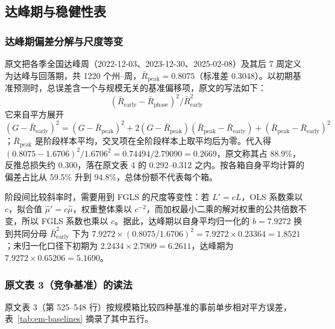 \subsection{达峰期与稳健性表}

\subsubsection{达峰期偏差分解与尺度等变}

原文把各季全国达峰周（2022-12-03、2023-12-30、2025-02-08）及其后 7 周定义为达峰与回落期，共 1220 个州–周，$\bar R_{\mathrm{peak}}=0.8075$（标准差 0.3048）。以初期基准预测时，总误差含一个与规模无关的基准偏移项，原文的写法如下：
\begin{equation*}
\left(\bar{R}_{\mathrm{early}}-\bar{R}_{\mathrm{phase}}\right)^2/\bar{R}_{\mathrm{early}}^2
\tag*{原文第 558 行}
\end{equation*}
它来自平方展开 $(G-\bar R_{\mathrm{early}})^2=(G-\bar R_{\mathrm{peak}})^2+2(G-\bar R_{\mathrm{peak}})(\bar R_{\mathrm{peak}}-\bar R_{\mathrm{early}})+(\bar R_{\mathrm{peak}}-\bar R_{\mathrm{early}})^2$；$\bar R_{\mathrm{peak}}$ 是阶段样本平均，交叉项在全阶段样本上取平均后为零。代入得 $(0.8075-1.6706)^2/1.6706^2=0.74494/2.79090=0.2669$，原文称其占 88.9\%，反推总损失约 0.300，落在原文表 4 的 0.292--0.312 之内。按各箱自身平均计算的偏差占比从 59.5\% 升到 94.8\%，总体份额不代表每个箱。

阶段间比较斜率时，需要用到 FGLS 的尺度等变性：若 $L'=cL$，OLS 系数乘以 $c$，拟合值 $\hat\mu'=c\hat\mu$，权重整体乘以 $c^{-2}$，而加权最小二乘的解对权重的公共倍数不变，所以 FGLS 系数也乘以 $c$。据此，达峰期以自身平均归一化的 $b=7.9272$ 换到共同分母 $\bar R_{\mathrm{early}}^2$ 下为 $7.9272\times(0.8075/1.6706)^2=7.9272\times0.23364=1.8521$；未归一化口径下初期为 $2.2434\times2.7909=6.2611$，达峰期为 $7.9272\times0.65206=5.1690$。

\subsubsection{原文表 3（竞争基准）的读法}

原文表 3（第 525--548 行）按规模箱比较四种基准的事前单步相对平方误差，表~\ref{tab:em-baselines} 摘录了其中五行。

